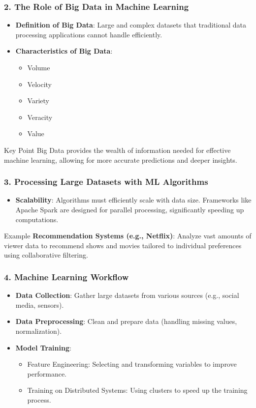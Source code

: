\documentclass[aspectratio=169]{beamer}
\begin{document}
\begin{frame}[fragile]
    \frametitle{2. The Role of Big Data in Machine Learning}
    \begin{itemize}
        \item \textbf{Definition of Big Data}: Large and complex datasets that traditional data processing applications cannot handle efficiently.
        \item \textbf{Characteristics of Big Data}:
            \begin{itemize}
                \item Volume
                \item Velocity
                \item Variety
                \item Veracity
                \item Value
            \end{itemize}
    \end{itemize}
    \begin{block}{Key Point}
        Big Data provides the wealth of information needed for effective machine learning, allowing for more accurate predictions and deeper insights.
    \end{block}
\end{frame}

\begin{frame}[fragile]
    \frametitle{3. Processing Large Datasets with ML Algorithms}
    \begin{itemize}
        \item \textbf{Scalability}: Algorithms must efficiently scale with data size. Frameworks like Apache Spark are designed for parallel processing, significantly speeding up computations.
    \end{itemize}
    \begin{block}{Example}
        \textbf{Recommendation Systems (e.g., Netflix)}: Analyze vast amounts of viewer data to recommend shows and movies tailored to individual preferences using collaborative filtering.
    \end{block}
\end{frame}

\begin{frame}[fragile]
    \frametitle{4. Machine Learning Workflow}
    \begin{itemize}
        \item \textbf{Data Collection}: Gather large datasets from various sources (e.g., social media, sensors).
        \item \textbf{Data Preprocessing}: Clean and prepare data (handling missing values, normalization).
        \item \textbf{Model Training}:
            \begin{itemize}
                \item Feature Engineering: Selecting and transforming variables to improve performance.
                \item Training on Distributed Systems: Using clusters to speed up the training process.
            \end{itemize}
    \end{itemize}
\end{frame}
\end{document}
